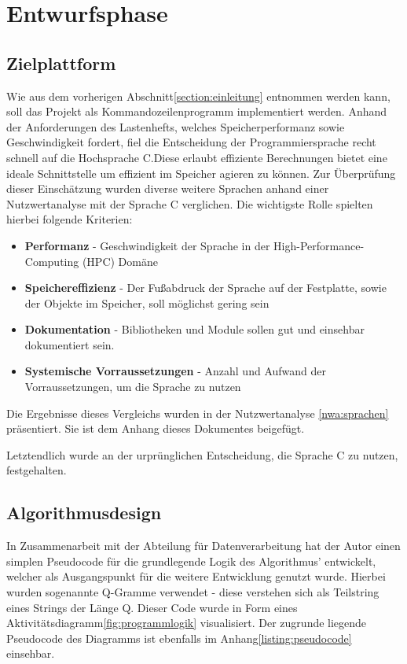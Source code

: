 \section{Entwurfsphase}


\subsection{Zielplattform}
Wie aus dem vorherigen Abschnitt\ref{section:einleitung} entnommen werden kann, soll das Projekt als Kommandozeilenprogramm
implementiert werden. Anhand der Anforderungen des Lastenhefts, welches Speicherperformanz sowie Geschwindigkeit fordert,
fiel die Entscheidung der Programmiersprache recht schnell auf die Hochsprache C.Diese erlaubt effiziente Berechnungen bietet eine ideale Schnittstelle um effizient im Speicher agieren zu können.
Zur Überprüfung dieser Einschätzung wurden diverse weitere Sprachen anhand einer
Nutzwertanalyse mit der Sprache C verglichen. Die wichtigste Rolle spielten hierbei folgende Kriterien:
\begin{itemize}
    \item \textbf{Performanz} - Geschwindigkeit der Sprache in der High-Performance-Computing (HPC) Domäne
    \item \textbf{Speichereffizienz} - Der Fußabdruck der Sprache auf der Festplatte, sowie der Objekte im Speicher, soll möglichst gering sein
    \item \textbf{Dokumentation} - Bibliotheken und Module sollen gut und einsehbar dokumentiert sein.
    \item \textbf{Systemische Vorraussetzungen} - Anzahl und Aufwand der Vorraussetzungen, um die Sprache zu nutzen
\end{itemize}

Die Ergebnisse dieses Vergleichs wurden in der Nutzwertanalyse \ref{nwa:sprachen} präsentiert.
Sie ist dem Anhang dieses Dokumentes beigefügt.\par
Letztendlich wurde an der urprünglichen Entscheidung, die Sprache C zu nutzen, festgehalten.

\subsection{Algorithmusdesign}
In Zusammenarbeit mit der Abteilung für Datenverarbeitung hat der Autor einen simplen
Pseudocode für die grundlegende Logik des Algorithmus' entwickelt, welcher als Ausgangspunkt
für die weitere Entwicklung genutzt wurde. Hierbei wurden sogenannte Q-Gramme verwendet - 
diese verstehen sich als Teilstring eines Strings der Länge Q. Dieser Code wurde in Form eines
Aktivitätsdiagramm\ref{fig:programmlogik} visualisiert. Der zugrunde liegende  Pseudocode des Diagramms ist ebenfalls im Anhang\ref{listing:pseudocode} einsehbar.



